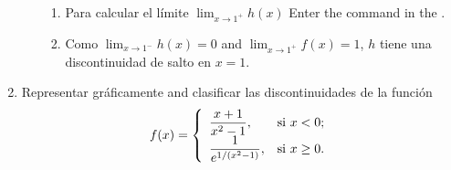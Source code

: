 \begin{enumerate}[leftmargin=*]
\begin{enumerate}
\begin{indication}
\begin{enumerate}
            \item Para calcular el límite $\lim_{x\rightarrow 1^+}h(x)$ Enter the command  in the .
            \item Como $\lim_{x\rightarrow 1^-}h(x)=0$ and $\lim_{x\rightarrow 1^+}f(x)=1$, $h$ tiene una discontinuidad de salto en $x=1$.
            \end{enumerate}
            \end{indication}
      \end{enumerate}


\item  Representar gráficamente and clasificar las discontinuidades de la función
      \[
      f(x)=
      \left\{
      \begin{array}{ll}
      \dfrac{x+1}{x^2-1},       & \hbox{si $x<0$;}     \\
      \dfrac{1}{e^{1/(x^2-1)}}, & \hbox{si $x\geq 0$.} \\
      \end{array}
      \right.
      \]


\end{enumerate}
